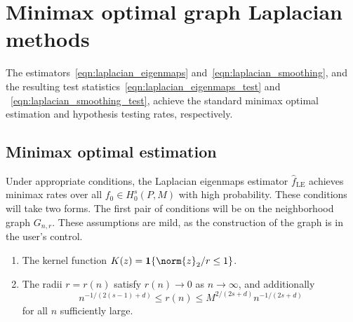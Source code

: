 \documentclass{article}
\newcommand{\1}{\mathbf{1}}
\newcommand{\wh}[1]{\widehat{#1}}
\newcommand{\LE}{\mathrm{LE}}
\theoremstyle{alden}
\theoremstyle{aldenthm}
\theoremstyle{definition}
\theoremstyle{remark}
\begin{document}
\section{Minimax optimal graph Laplacian methods}

The estimators~\eqref{eqn:laplacian_eigenmaps} and~\eqref{eqn:laplacian_smoothing}, and the resulting test statistics~\eqref{eqn:laplacian_eigenmaps_test} and ~\eqref{eqn:laplacian_smoothing_test}, achieve the standard minimax optimal estimation and hypothesis testing rates, respectively. 

\subsection{Minimax optimal estimation}

Under appropriate conditions, the Laplacian eigenmaps estimator $\wh{f}_{\LE}$ achieves minimax rates over all $f_0 \in H_0^s(P,M)$ with high probability. These conditions will take two forms. The first pair of conditions will be on the neighborhood graph $G_{n,r}$. These assumptions are mild, as the construction of the graph is in the user's control.
\begin{enumerate}[label=(K\arabic*)]
	\item 
	\label{asmp:kernel_form}
	The kernel function $K(z) = \1\{\norm{z}_2/r \leq 1 \}$.
	\item 
	\label{asmp:kernel_radius}
	The radii $r = r(n)$ satisfy $r(n) \to 0$ as $n \to \infty$, and additionally
	\begin{equation*}
	n^{-1/(2(s - 1) + d)}\leq r(n) \leq M^{2/(2s + d)}n^{-1/(2s + d)}
	\end{equation*}
	for all $n$ sufficiently large.
\end{enumerate}
\end{document}
